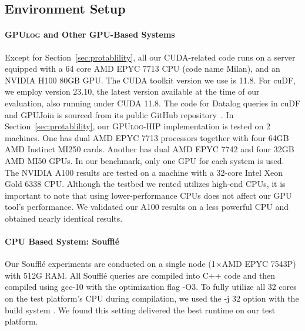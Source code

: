 \documentclass[nonacm,sigplan]{acmart}
\newcommand{\tool}{\textsc{GPUlog}}
\newcommand{\yihao}[1]{{#1}}
\newcommand{\revised}[1]{{#1}}
\begin{document}
\subsection{Environment Setup}

\paragraph*{\tool{} and Other GPU-Based Systems}
Except for Section~\ref{sec:protablility}, all our CUDA-related code runs on a server equipped with a 64 core AMD EPYC 7713 CPU (code name Milan), and an NVIDIA H100 80GB GPU. \yihao{The CUDA toolkit version we use is 11.8. For cuDF, we employ version 23.10, the latest version available at the time of our evaluation, also running under CUDA 11.8.} The code for Datalog queries in cuDF and GPUJoin is sourced from its public GitHub repository~\cite{gpujoincode}. In Section~\ref{sec:protablility}, our \tool{}-HIP implementation is tested on 2 machines. One has dual AMD EPYC 7713 processors together with four 64GB AMD Instinct MI250 cards. Another has dual AMD EPYC 7742 and four 32GB AMD MI50 GPUs. In our benchmark, only one GPU for each system is used. The NVIDIA A100 results are tested on a machine with a 32-core Intel Xeon Gold 6338 CPU. \yihao{Although the testbed we rented utilizes high-end CPUs, it is important to note that using lower-performance CPUs does not affect our GPU tool's performance. We validated our A100 results on a less powerful CPU and obtained nearly identical results.}

\paragraph*{CPU Based System: Souffl\'e}
Our Souffl\'e experiments are conducted on a single node (1$\times$AMD EPYC 7543P) with 512G RAM. All Souffl\'e queries are compiled into C++ code \revised{and then compiled using gcc-10 with the optimization flag -O3. To fully utilize all 32 cores on the test platform’s CPU during compilation, we used the -j 32 option with the build system} . We found this setting delivered the best runtime on our test platform.

\end{document}

